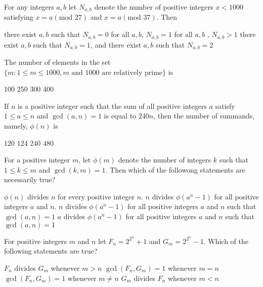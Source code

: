\documentclass[10pt]{exam}
\begin{document}
\begin{questions}
\question
For any integers $a,b$ let $N_{a,b}$ denote the number of positive integers $x<1000$ satisfying $x=a (\text{mod } 27)$ and $x=a (\text{mod } 37)$. Then

\begin{choices}
\choice there exist $a,b$ such that $N_{a,b}=0$
\choice for all $a,b$, $N_{a,b}=1$
\choice for all $a,b$ , $N_{a,b}>1$
\choice there exist $a,b$ such that $N_{a,b}=1$, and there exist $a,b$ such that $N_{a,b}=2$
\end{choices}

\question
The number of elements in the set $\{m:1\leq m \leq 1000, m \text{ and } 1000 \text{ are relatively prime} \}$ is

\begin{oneparchoices}
\choice $100$
\choice $250$
\choice $300$
\choice $400$
\end{oneparchoices}

\question 
If $n$ is a positive integer such that the sum of all positive integers $a$ satisfy $1 \leq a \leq n$ and $\gcd(a,n) = 1$ is equal to $240 n $, then the number of summands, namely, $\phi(n)$ is 

\begin{oneparchoices}
\choice $120$
\choice $124$
\choice $240$ 
\choice $480$
\end{oneparchoices}

\question
For a positive integer $m$, let $\phi(m)$ denote the number of integers $k$ such that $1 \leq k \leq m$ and $\gcd(k,m)=1$. Then which of the followong statements are necessarily true?

\begin{checkboxes}
\choice $\phi(n)$ divides $n$ for every positive integer $n$.
\choice $n$ divides $\phi(a^n-1)$ for all positive integers $a$ and $n$.
\choice $n$ divides $\phi(a^n-1)$ for all positive integers $a$ and $n$ such that $\gcd(a,n)=1$ 
\choice $a$ divides $\phi(a^n-1)$ for all positive integers $a$ and $n$ such that $\gcd(a,n)=1$ 
\end{checkboxes}


\question 
For positive integers $m$ and $n$ let $F_n = 2^{2^n} + 1 $ and $G_m = 2^{2^n} -1 $. Which of the following statements are true?

\begin{checkboxes}
\choice $F_n$ divides $G_m$ whenever $m > n$ 
\choice $\gcd(F_n, G_m) = 1$ whenever $m =  n$ 
\choice $\gcd(F_n, G_m) = 1$ whenever $m \neq n$ 
\choice $G_m$ divides $F_n$ whenever $m < n$ 
\end{checkboxes} 



\end{questions}
\end{document}
